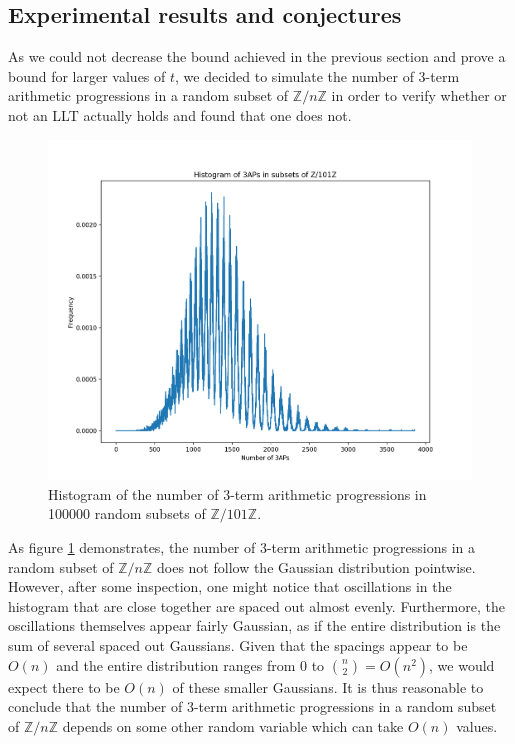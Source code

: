 \documentclass[12pt]{article} %
\newcommand{\Z}{\mathbb{Z}}
\theoremstyle{definition}
\theoremstyle{definition}
\begin{document}
\subsection{Experimental results and conjectures}

As we could not decrease the bound achieved in the previous section and prove a bound for larger values of $t$, we decided to simulate the number of 3-term arithmetic progressions in a random subset of $\Z / n \Z$ in order to verify whether or not an LLT actually holds and found that one does not.

\begin{figure}[t]
	\centering
	\includegraphics[width=\textwidth]{3ap-hist}
    \caption{Histogram of the number of 3-term arithmetic progressions in 100000 random subsets of $\Z / 101\Z$.}
    \label{fig:3ap}
\end{figure}

As figure \ref{fig:3ap} demonstrates, the number of 3-term arithmetic progressions in a random subset of $\Z / n \Z$ does not follow the Gaussian distribution pointwise. However, after some inspection, one might notice that oscillations in the histogram that are close together are spaced out almost evenly. Furthermore, the oscillations themselves appear fairly Gaussian, as if the entire distribution is the sum of several spaced out Gaussians. Given that the spacings appear to be $O(n)$ and the entire distribution ranges from 0 to $\binom{n}{2} = O(n^2)$, we would expect there to be $O(n)$ of these smaller Gaussians. It is thus reasonable to conclude that the number of 3-term arithmetic progressions in a random subset of $\Z / n\Z$ depends on some other random variable which can take $O(n)$ values.
\end{document}
